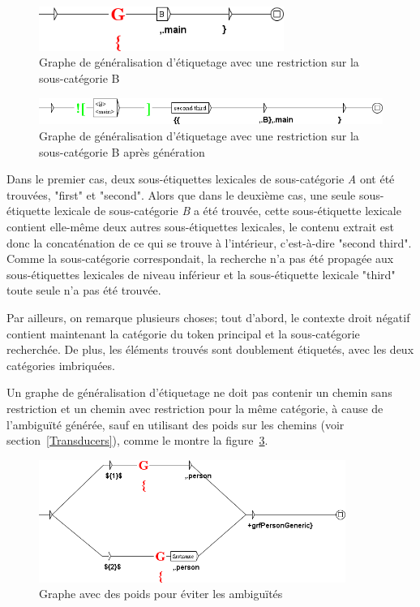 \begin{figure}[!htb]
  \centering
  \includegraphics[width=8cm]{resources/img/graphe_restriction_B.png}
  \caption{Graphe de généralisation d'étiquetage avec une restriction sur la sous-catégorie B}
  \label{fig:graphe_restriction_B}
\end{figure}

\begin{figure}[!htb]
  \centering
  \includegraphics[width=14cm]{resources/img/graphe_restriction_B_genere.png}
  \caption{Graphe de généralisation d'étiquetage avec une restriction sur la sous-catégorie B après génération}
  \label{fig:graphe_restriction_B_genere}
\end{figure}

\bigskip
Dans le premier cas, deux sous-étiquettes lexicales de sous-catégorie \textit{A} ont été trouvées, "first" et "second". Alors que dans le deuxième cas, une seule sous-étiquette lexicale de sous-catégorie \textit{B} a été trouvée, cette sous-étiquette lexicale contient elle-même deux autres sous-étiquettes lexicales, le contenu extrait est donc la concaténation de ce qui se trouve à l'intérieur, c'est-à-dire "second third". Comme la sous-catégorie correspondait, la recherche n'a pas été propagée aux sous-étiquettes lexicales de niveau inférieur et la sous-étiquette lexicale "third" toute seule n'a pas été trouvée.

Par ailleurs, on remarque plusieurs choses; tout d'abord, le contexte droit négatif contient maintenant la catégorie du token principal et la sous-catégorie recherchée. De plus, les éléments trouvés sont doublement étiquetés, avec les deux catégories imbriquées.

\bigskip
Un graphe de généralisation d'étiquetage ne doit pas contenir un chemin sans restriction et un chemin avec restriction pour la même catégorie, à cause de l'ambiguïté générée, sauf en utilisant des poids sur les chemins (voir section~\ref{Transducers}), comme le montre la figure~\ref{fig:graphe_poids}.

\begin{figure}[!htb]
  \centering
  \includegraphics[width=10cm]{resources/img/graphe_poids.png}
  \caption{Graphe avec des poids pour éviter les ambiguïtés}
  \label{fig:graphe_poids}
\end{figure}

